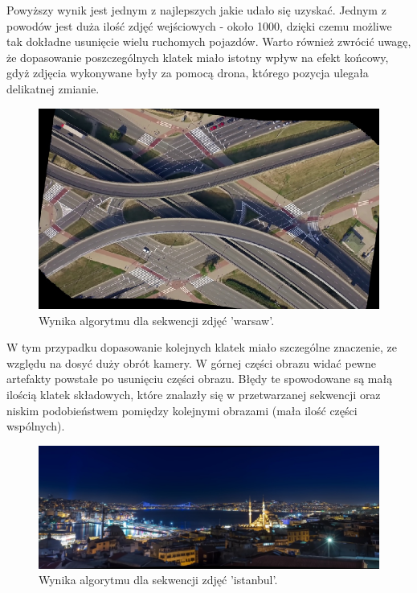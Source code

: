 Powyższy wynik jest jednym z najlepszych jakie udało się uzyskać. Jednym z powodów jest duża ilość zdjęć wejściowych - około 1000, dzięki czemu możliwe tak dokładne usunięcie wielu ruchomych pojazdów. Warto również zwrócić uwagę, że dopasowanie poszczególnych klatek miało istotny wpływ na efekt końcowy, gdyż zdjęcia wykonywane były za pomocą drona, którego pozycja ulegała delikatnej zmianie.

\begin{figure}[H]
	\centering
		\includegraphics[width=1.0\linewidth]{img/warsaw_out.png}
	\caption[Wynika dla sekwencji zdjęć 'warsaw'.]{Wynika algorytmu dla sekwencji zdjęć 'warsaw'.}
	\label{fig:binary}
\end{figure}

W tym przypadku dopasowanie kolejnych klatek miało szczególne znaczenie, ze względu na dosyć duży obrót kamery. W górnej części obrazu widać pewne artefakty powstałe po usunięciu części obrazu. Błędy te spowodowane są małą ilością klatek składowych, które znalazły się w przetwarzanej sekwencji oraz niskim podobieństwem pomiędzy kolejnymi obrazami (mała ilość części wspólnych).

\begin{figure}[H]
	\centering
		\includegraphics[width=1.0\linewidth]{img/istanbul_out.png}
	\caption[Wynika dla sekwencji zdjęć 'istanbul'.]{Wynika algorytmu dla sekwencji zdjęć 'istanbul'.}
	\label{fig:binary}
\end{figure}

